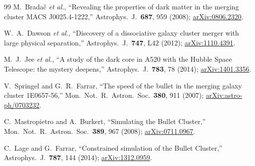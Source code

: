 \documentclass[prd,twocolumn,superscriptaddress,longbibliography,floatfix]{revtex4-2}
\begin{document}
\begin{thebibliography}{99}
M.~Brada\v{c} \emph{et al.},
``Revealing the properties of dark matter in the merging cluster
MACS J0025.4-1222,''
Astrophys.\ J.\ \textbf{687}, 959 (2008);
\href{https://arxiv.org/abs/0806.2320}{arXiv:0806.2320}.

W.~A.~Dawson \emph{et al.},
``Discovery of a dissociative galaxy cluster merger with large physical
separation,''
Astrophys.\ J.\ \textbf{747}, L42 (2012);
\href{https://arxiv.org/abs/1110.4391}{arXiv:1110.4391}.

M.~J.~Jee \emph{et al.},
``A study of the dark core in A520 with the Hubble Space Telescope:
the mystery deepens,''
Astrophys.\ J.\ \textbf{783}, 78 (2014);
\href{https://arxiv.org/abs/1401.3356}{arXiv:1401.3356}.

V.~Springel and G.~R.~Farrar,
``The speed of the bullet in the merging galaxy cluster 1E0657-56,''
Mon.\ Not.\ R.\ Astron.\ Soc.\ \textbf{380}, 911 (2007);
\href{https://arxiv.org/abs/astro-ph/0703232}{arXiv:astro-ph/0703232}.

C.~Mastropietro and A.~Burkert,
``Simulating the Bullet Cluster,''
Mon.\ Not.\ R.\ Astron.\ Soc.\ \textbf{389}, 967 (2008);
\href{https://arxiv.org/abs/0711.0967}{arXiv:0711.0967}.

C.~Lage and G.~Farrar,
``Constrained simulation of the Bullet Cluster,''
Astrophys.\ J.\ \textbf{787}, 144 (2014);
\href{https://arxiv.org/abs/1312.0959}{arXiv:1312.0959}.

\end{thebibliography}
\end{document}
